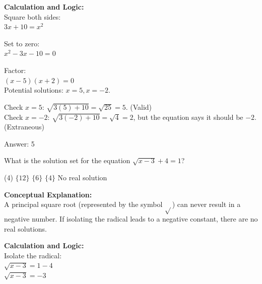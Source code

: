 \documentclass[11pt,paper=a4,answers]{exam}
\begin{document}
\begin{questions}
\begin{solution}
\vspace{20pt}

\textbf{Calculation and Logic:} \\
Square both sides: \\
$3x + 10 = x^2$

\vspace{10pt}

Set to zero: \\
$x^2 - 3x - 10 = 0$

\vspace{10pt}

Factor: \\
$(x - 5)(x + 2) = 0$ \\
Potential solutions: $x = 5, x = -2$.

\vspace{10pt}

Check $x = 5$: $\sqrt{3(5) + 10} = \sqrt{25} = 5$. (Valid) \\
Check $x = -2$: $\sqrt{3(-2) + 10} = \sqrt{4} = 2$, but the equation says it should be $-2$. (Extraneous)

\vspace{25pt}

Answer: \colorbox{yellow!100}{5}
\end{solution}

\vspace{40pt}

\question
What is the solution set for the equation $\sqrt{x - 3} + 4 = 1$?
\begin{tasks}(4)
    \task $\{12\}$
    \task $\{6\}$
    \task $\{4\}$
    \task No real solution
\end{tasks}

\begin{solution}
\textbf{Conceptual Explanation:} \\
A principal square root (represented by the symbol $\sqrt{ }$) can never result in a negative number. If isolating the radical leads to a negative constant, there are no real solutions.

\vspace{20pt}

\textbf{Calculation and Logic:} \\
Isolate the radical: \\
$\sqrt{x - 3} = 1 - 4$ \\
$\sqrt{x - 3} = -3$

\vspace{10pt}


\end{solution}
\end{questions}
\end{document}
